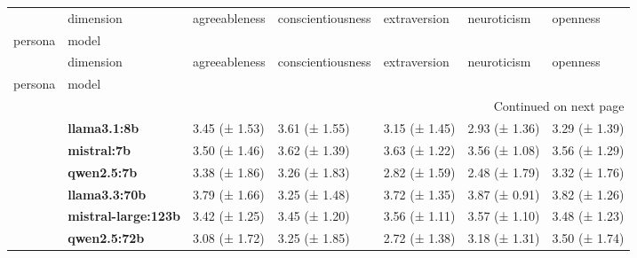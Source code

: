 \begin{longtable}{lllllll}
\toprule
 & dimension & agreeableness & conscientiousness & extraversion & neuroticism & openness \\
persona & model &  &  &  &  &  \\
\midrule
\endfirsthead
\toprule
 & dimension & agreeableness & conscientiousness & extraversion & neuroticism & openness \\
persona & model &  &  &  &  &  \\
\midrule
\endhead
\midrule
\multicolumn{7}{r}{Continued on next page} \\
\midrule
\endfoot
\bottomrule
\endlastfoot
\multirow[t]{6}{*}{\textbf{base}} & \textbf{llama3.1:8b} & 3.45 (± 1.53) & 3.61 (± 1.55) & 3.15 (± 1.45) & 2.93 (± 1.36) & 3.29 (± 1.39) \\
\textbf{} & \textbf{mistral:7b} & 3.50 (± 1.46) & 3.62 (± 1.39) & 3.63 (± 1.22) & 3.56 (± 1.08) & 3.56 (± 1.29) \\
\textbf{} & \textbf{qwen2.5:7b} & 3.38 (± 1.86) & 3.26 (± 1.83) & 2.82 (± 1.59) & 2.48 (± 1.79) & 3.32 (± 1.76) \\
\textbf{} & \textbf{llama3.3:70b} & 3.79 (± 1.66) & 3.25 (± 1.48) & 3.72 (± 1.35) & 3.87 (± 0.91) & 3.82 (± 1.26) \\
\textbf{} & \textbf{mistral-large:123b} & 3.42 (± 1.25) & 3.45 (± 1.20) & 3.56 (± 1.11) & 3.57 (± 1.10) & 3.48 (± 1.23) \\
\textbf{} & \textbf{qwen2.5:72b} & 3.08 (± 1.72) & 3.25 (± 1.85) & 2.72 (± 1.38) & 3.18 (± 1.31) & 3.50 (± 1.74) \\
\cline{1-7}
\end{longtable}

